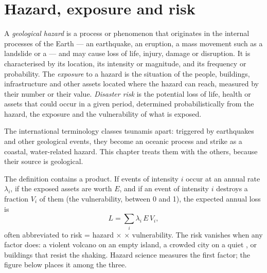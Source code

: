\section{Hazard, exposure and risk}\label{sec:b2:geological-hazards:risk}

\begin{definition}\label{def:b2:geological-hazards:risk}
A \emph{geological hazard} is a process or phenomenon that originates in
the internal processes of the Earth --- an earthquake, an eruption, a mass movement such as a
landslide or a  --- and may cause loss of life, injury, damage or disruption. It is
characterised by its location, its intensity or magnitude, and its frequency or probability. The
\emph{exposure} to a hazard is the situation of the people,
buildings, infrastructure and other assets located where the hazard can reach, measured by their
number or their value. \emph{Disaster risk} is the potential loss of life,
health or assets that could occur in a given period, determined probabilistically from the
hazard, the exposure and the vulnerability of what is exposed.
\end{definition}

The international terminology classes tsunamis apart: triggered by earthquakes and other
geological events, they become an oceanic process and strike as a coastal, water-related hazard.
This chapter treats them with the others, because their source is geological.

The definition contains a product. If events of intensity $i$ occur at an annual rate
$\lambda_i$, if the exposed assets are worth $E$, and if an event of intensity $i$ destroys a
fraction $V_i$ of them (the vulnerability, between 0 and 1), the expected annual loss is
\begin{equation}
L = \sum_i \lambda_i \, E \, V_i ,
\label{eq:b2:geological-hazards:loss}
\end{equation}
often abbreviated to risk = hazard $\times$  $\times$ vulnerability. The risk vanishes when
any factor does: a violent volcano on an empty island, a crowded city on a quiet , or
buildings that resist the shaking. Hazard science measures the first factor; the figure below
places it among the three.

